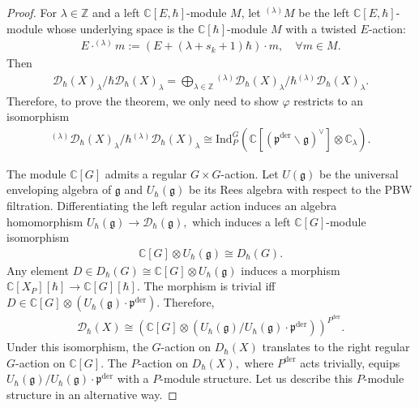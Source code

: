 \documentclass[11pt,a4paper,usenames,dvipsnames,reqno]{amsart}
\numberwithin{equation}{section}
\newcommand{\cc}{\mathbb C}
\newcommand{\zz}{\mathbb Z}
\newcommand{\fg}{\mathfrak g}
\newcommand{\fp}{\mathfrak p}
\newcommand{\der}{\mathrm{der}}
\theoremstyle{definition}
\theoremstyle{remark}
\begin{document}
\begin{proof}
For $\lambda\in \zz$ and a left $\cc[E,\hbar]$-module $M$, let $^{(\lambda)}M$ be the left $\cc[E,\hbar]$-module whose underlying space is the $\cc[\hbar]$-module $M$ with a twisted $E$-action: 
\begin{align*}
    E\cdot^{(\lambda)} m:=(E+(\lambda+s_k+1)\hbar)\cdot m, \quad\forall m\in M. 
\end{align*} 
Then 
\begin{align*}
    \mathcal{D}_{\hbar}(X)_\lambda/\hbar \mathcal{D}_{\hbar}(X)_\lambda=\bigoplus_{\lambda\in \zz}{}^{(\lambda)}\mathcal{D}_{\hbar}(X)_\lambda/\hbar {}^{(\lambda)}\mathcal{D}_{\hbar}(X)_\lambda.
\end{align*}
Therefore, to prove the theorem, we only need to show $\varphi$ restricts to an isomorphism
\begin{align*}
    {}^{(\lambda)}\mathcal{D}_{\hbar}(X)_\lambda/\hbar{}^{(\lambda)}\mathcal{D}_{\hbar}(X)_\lambda\cong  \mathrm{Ind}_P^G(\cc[(\fp^\der\backslash \fg)^\lor]\otimes\cc_{\lambda}).
\end{align*}

The module $\cc[G]$ admits a regular $G\times G$-action. Let $U(\mathfrak{g})$ be the universal enveloping algebra of $\mathfrak{g}$ and $U_{\hbar}(\fg)$ be its Rees algebra with respect to the PBW filtration. Differentiating the left regular action induces an algebra homomorphism $U_{\hbar}(\fg)\longrightarrow \mathcal{D}_\hbar(\fg),$ which induces a left $\cc[G]$-module isomorphism 
\begin{align*}
    \cc[G]\otimes U_{\hbar}(\mathfrak{g})\cong D_{\hbar}(G).
\end{align*}
Any element $D\in D_{\hbar}(G)\cong \cc[G]\otimes U_{\hbar}(\mathfrak{g})$ induces a morphism $\cc[X_P][\hbar]\longrightarrow \cc[G][\hbar]$. The morphism is trivial iff $D\in \cc[G]\otimes \left(  U_{\hbar}(\mathfrak{g})\cdot\fp^\der\right).$ Therefore,
\begin{align}\label{eq:DtoU}
    \mathcal{D}_{\hbar}(X)\cong \left(\cc[G]\otimes \left( U_{\hbar}(\mathfrak{g}) /  U_{\hbar}(\mathfrak{g})\cdot\fp^\der\right) \right)^{P^{\mathrm{der}}}.
\end{align}
Under this isomorphism, the $G$-action on $D_\hbar(X)$ translates to the right regular $G$-action on $\cc[G].$ The $P$-action on $D_{\hbar}(X),$ where $P^{\mathrm{der}}$ acts trivially, equips $U_{\hbar}(\mathfrak{g}) /U_{\hbar}(\mathfrak{g})\cdot\fp^\der$ with a $P$-module structure. Let us describe this $P$-module structure in an alternative way.



\end{proof}
\end{document}
